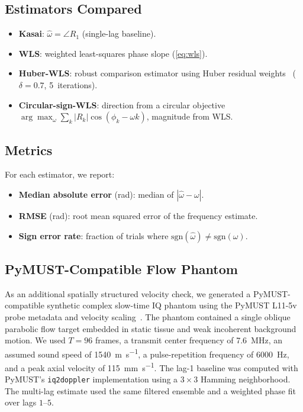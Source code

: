 \documentclass[11pt]{article}
\begin{document}
\subsection{Estimators Compared}

\begin{itemize}
  \item \textbf{Kasai}: $\hat\omega = \angle R_1$ (single-lag baseline).
  \item \textbf{WLS}: weighted least-squares phase slope
    (\cref{eq:wls}).
  \item \textbf{Huber-WLS}: robust comparison estimator using Huber
    residual weights~\cite{huber1964robust} ($\delta = 0.7$, 5~iterations).
  \item \textbf{Circular-sign-WLS}: direction from a circular
    objective $\arg\max_\omega \sum_k |R_k| \cos(\phi_k - \omega k)$,
    magnitude from WLS.
\end{itemize}

\subsection{Metrics}

For each estimator, we report:
\begin{itemize}
  \item \textbf{Median absolute error} (rad): median of $|\hat\omega
    - \omega|$.
  \item \textbf{RMSE} (rad): root mean squared error of the frequency
    estimate.
  \item \textbf{Sign error rate}: fraction of trials where
    $\text{sgn}(\hat\omega) \neq \text{sgn}(\omega)$.
\end{itemize}

\subsection{PyMUST-Compatible Flow Phantom}

As an additional spatially structured velocity check, we generated a
PyMUST-compatible synthetic complex slow-time IQ phantom using the
PyMUST L11-5v probe metadata and velocity scaling~\cite{bernardino2024pymust}.
The phantom contained a single oblique parabolic flow target embedded
in static tissue and weak incoherent background motion.  We used
$T=96$ frames, a transmit center frequency of
\SI{7.6}{\mega\hertz}, an assumed sound speed of
\SI{1540}{\meter\per\second}, a pulse-repetition frequency of
\SI{6000}{\hertz}, and a peak axial velocity of
\SI{115}{\milli\meter\per\second}.  The lag-1 baseline was computed
with PyMUST's \texttt{iq2doppler} implementation using a $3\times3$
Hamming neighborhood.  The multi-lag estimate used the same filtered
ensemble and a weighted phase fit over lags $1$--$5$.
\end{document}
